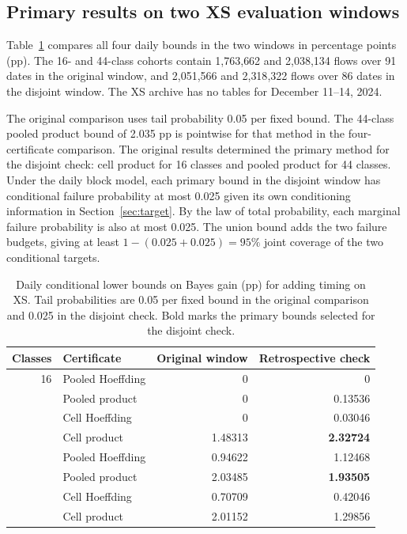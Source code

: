 \documentclass[preprint,11pt]{elsarticle}
\begin{document}
\subsection{Primary results on two XS evaluation windows}
\label{sec:temporal-check}

Table~\ref{tab:primary-xs} compares all four daily bounds in the two windows in percentage points (pp). The 16- and 44-class cohorts contain 1{,}763{,}662 and 2{,}038{,}134 flows over 91 dates in the original window, and 2{,}051{,}566 and 2{,}318{,}322 flows over 86 dates in the disjoint window. The XS archive has no tables for December 11--14, 2024.

The original comparison uses tail probability 0.05 per fixed bound. The 44-class pooled product bound of 2.035 pp is pointwise for that method in the four-certificate comparison. The original results determined the primary method for the disjoint check: cell product for 16 classes and pooled product for 44 classes. Under the daily block model, each primary bound in the disjoint window has conditional failure probability at most 0.025 given its own conditioning information in Section~\ref{sec:target}. By the law of total probability, each marginal failure probability is also at most 0.025. The union bound adds the two failure budgets, giving at least $1-(0.025+0.025)=95\%$ joint coverage of the two conditional targets.

\begin{table}[!ht]
\centering
\small
\caption{Daily conditional lower bounds on Bayes gain (pp) for adding timing on XS. Tail probabilities are 0.05 per fixed bound in the original comparison and 0.025 in the disjoint check. Bold marks the primary bounds selected for the disjoint check.}
\label{tab:primary-xs}
\begin{tabular}{rlrr}
\toprule
Classes & Certificate & Original window & Retrospective check \\
\midrule
16 & Pooled Hoeffding & 0 & 0 \\
   & Pooled product & 0 & 0.13536 \\
   & Cell Hoeffding & 0 & 0.03046 \\
   & Cell product & 1.48313 & \textbf{2.32724} \\
\addlinespace
44 & Pooled Hoeffding & 0.94622 & 1.12468 \\
   & Pooled product & 2.03485 & \textbf{1.93505} \\
   & Cell Hoeffding & 0.70709 & 0.42046 \\
   & Cell product & 2.01152 & 1.29856 \\
\bottomrule
\end{tabular}
\end{table}
\end{document}
